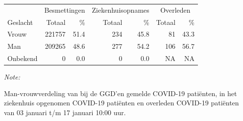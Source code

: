\documentclass[
  english,
  man,floatsintext]{apa6}
\begin{document}
\begin{table}
\centering\begingroup\fontsize{11}{13}\selectfont

\begin{threeparttable}
\begin{tabular}{lrrrrrr}
\toprule
\multicolumn{1}{c}{ } & \multicolumn{2}{c}{Besmettingen} & \multicolumn{2}{c}{Ziekenhuisopnames} & \multicolumn{2}{c}{Overleden} \\
\cmidrule(l{3pt}r{3pt}){2-3} \cmidrule(l{3pt}r{3pt}){4-5} \cmidrule(l{3pt}r{3pt}){6-7}
Geslacht & Totaal & \% & Totaal & \% & Totaal & \%\\
\midrule
Vrouw & 221757 & 51.4 & 234 & 45.8 & 81 & 43.3\\
Man & 209265 & 48.6 & 277 & 54.2 & 106 & 56.7\\
Onbekend & 0 & 0.0 & 0 & 0.0 & NA & NA\\
\bottomrule
\end{tabular}
\begin{tablenotes}
\item \textit{Note: } 
\item Man-vrouwverdeling van bij de GGD’en gemelde COVID-19 patiënten, in het ziekenhuis opgenomen COVID-19 patiënten en overleden COVID-19 patiënten van 03 januari t/m 17 januari 10:00 uur.
\end{tablenotes}
\end{threeparttable}
\endgroup{}
\end{table}
\newpage
\end{document}
